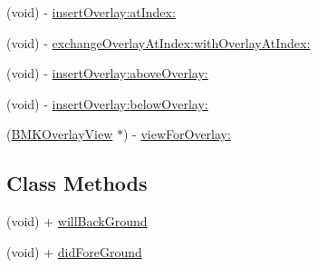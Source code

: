 \begin{DoxyCompactItemize}
(void) -\/ \hyperlink{interface_b_m_k_map_view_adc0775a2651c1e4099f93d9c1bbffe3d}{insert\+Overlay\+:at\+Index\+:}
\item 
(void) -\/ \hyperlink{interface_b_m_k_map_view_a62c1c29b8e5b408ba0c40411a3c1f50f}{exchange\+Overlay\+At\+Index\+:with\+Overlay\+At\+Index\+:}
\item 
(void) -\/ \hyperlink{interface_b_m_k_map_view_ad94b45c4df7978e3a6095918323496d3}{insert\+Overlay\+:above\+Overlay\+:}
\item 
(void) -\/ \hyperlink{interface_b_m_k_map_view_a73dfe9f74d722b7b1fc477e791f34653}{insert\+Overlay\+:below\+Overlay\+:}
\item 
(\hyperlink{interface_b_m_k_overlay_view}{B\+M\+K\+Overlay\+View} $\ast$) -\/ \hyperlink{interface_b_m_k_map_view_aa88093440ad22f7af9cf9a36051f662d}{view\+For\+Overlay\+:}
\end{DoxyCompactItemize}
\subsection*{Class Methods}
\begin{DoxyCompactItemize}
\item 
(void) + \hyperlink{interface_b_m_k_map_view_a2f7752221a3c2ba2682cddbcd351f0fc}{will\+Back\+Ground}
\item 
(void) + \hyperlink{interface_b_m_k_map_view_ae9e5519e547a14d2fc5479c28f724560}{did\+Fore\+Ground}
\end{DoxyCompactItemize}
